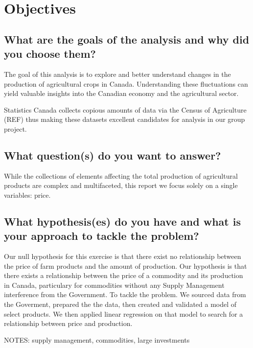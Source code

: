 \section{Objectives}

\subsection{What are the goals of the analysis and why did you choose them?}

The goal of this analysis is to explore and better understand changes in the production of agricultural crops in Canada.
Understanding these fluctuations can yield valuable insights into the Canadian economy and the agricultural sector.

Statistics Canada collects copious amounts of data via the Census of Agriculture (REF) thus making these datasets excellent candidates for analysis in our group project.

\subsection{What question(s) do you want to answer?}

While the collections of elements affecting the total production of agricultural products are complex and multifaceted, this report we focus solely on a single variables: price.

\subsection{What hypothesis(es) do you have and what is your approach to tackle the problem?}

Our null hypothesis for this exercise is that there exist no relationship between the price of farm products and the amount of production. Our hypothesis is that there exists a relationship between the price of a commodity and its production in Canada, particulary for commodities without any Supply Management interference from the Government. 
To tackle the problem. We sourced data from the Goverment, prepared the the data, then created and validated a model of select products.  We then applied linear regression on that model to search for a relationship between price and production. 

NOTES: supply management, commodities, large investments